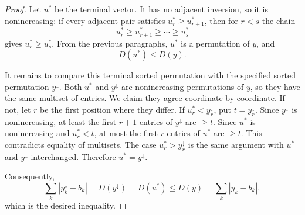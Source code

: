 \begin{proof}
Let \(u^*\) be the terminal vector.  It has no adjacent inversion, so it is
nonincreasing: if every adjacent pair satisfies \(u^*_r\ge u^*_{r+1}\), then
for \(r<s\) the chain
\[
u^*_r\ge u^*_{r+1}\ge\cdots\ge u^*_s
\]
gives \(u^*_r\ge u^*_s\).  From the previous paragraphs, \(u^*\) is a
permutation of \(y\), and
\[
D(u^*)\le D(y).
\]

It remains to compare this terminal sorted permutation with the specified
sorted permutation \(y^\downarrow\).  Both \(u^*\) and \(y^\downarrow\) are
nonincreasing permutations of \(y\), so they have the same multiset of
entries.  We claim they agree coordinate by coordinate.  If not, let \(r\)
be the first position where they differ.  If
\(u^*_r<y^\downarrow_r\), put \(t=y^\downarrow_r\).  Since
\(y^\downarrow\) is nonincreasing, at least the first \(r+1\) entries of
\(y^\downarrow\) are \(\ge t\).  Since \(u^*\) is nonincreasing and
\(u^*_r<t\), at most the first \(r\) entries of \(u^*\) are \(\ge t\).  This
contradicts equality of multisets.  The case \(u^*_r>y^\downarrow_r\) is
the same argument with \(u^*\) and \(y^\downarrow\) interchanged.  Therefore
\(u^*=y^\downarrow\).

Consequently,
\[
\sum_k |y^\downarrow_k-b_k|
=D(y^\downarrow)
=D(u^*)
\le D(y)
=\sum_k |y_k-b_k|,
\]
which is the desired inequality.
\end{proof}
